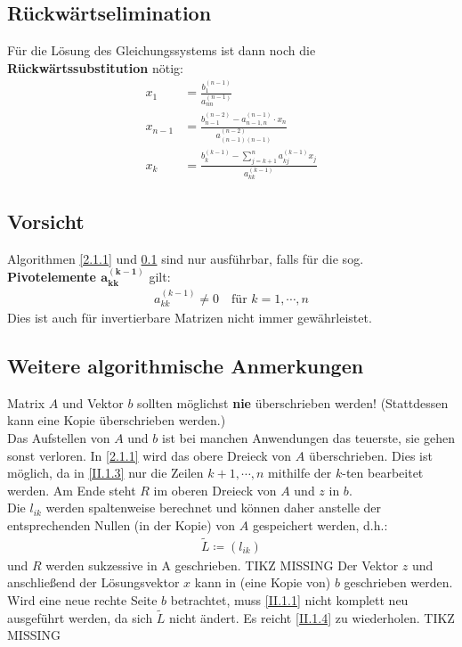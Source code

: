 \documentclass[ngerman,fontsize=11pt, paper=a4, parskip=false, titlepage=false, toc=bib]{scrbook}
\begin{document}
\subsection{Rückwärtselimination}\label{2.1.2}
Für die Lösung des Gleichungssystems ist dann noch die \textbf{Rückwärtssubstitution}  nötig:
\begin{align}
	x_1 &= \frac{b_1^{(n-1)}}{a_{nn}^{(n-1)}} \label{II.1.5} \\
	x_{n-1} &=  \frac{b_{n-1}^{(n-2)}-a_{n-1,n}^{(n-1)}\cdot x_n}{a_{(n-1)(n-1)}^{(n-2)}} \label{II.1.6} \\
	x_k &= \frac{b_k^{(k-1)}-\sum_{j=k+1}^{n}a_{kj}^{(k-1)}x_j}{a_{kk}^{(k-1)}} \label{II.1.7}
\end{align}

\subsection{Vorsicht}
	Algorithmen \ref{2.1.1} und \ref{2.1.2} sind nur ausführbar, falls für die sog. \textbf{Pivotelemente $\mathbf{a_{kk}^{(k-1)}}$ }  gilt:
	\begin{gather*}
			a_{kk}^{(k-1)} \neq 0 \quad   \text{für } k=1, \cdots , n
	\end{gather*}
	Dies ist auch für invertierbare Matrizen nicht immer gewährleistet.
	
\subsection{Weitere algorithmische Anmerkungen}	\label{2.1.4}
Matrix $A$ und Vektor $b$ sollten möglichst \textbf{nie} überschrieben werden! (Stattdessen kann eine Kopie überschrieben werden.) \\
Das Aufstellen von $A$ und $b$ ist bei manchen Anwendungen das teuerste, sie gehen sonst verloren. In \ref{2.1.1} wird das obere Dreieck von $A$ überschrieben. Dies ist möglich, da in \eqref{II.1.3} nur die Zeilen $k+1, \cdots, n$ mithilfe der $k$-ten bearbeitet werden. Am Ende steht $R$ im oberen Dreieck von $A$ und $z$ in $b$. \\
Die $l_{ik}$ werden spaltenweise berechnet und können daher anstelle der entsprechenden Nullen (in der Kopie) von $A$ gespeichert werden, d.h.:
\begin{gather}
	\widetilde{L} \coloneqq (l_{ik})  \label{II.1.8}
\end{gather}
und $R$ werden sukzessive in A geschrieben.
TIKZ MISSING
Der Vektor $z$ und anschließend der Lösungsvektor $x$ kann in (eine Kopie von) $b$ geschrieben werden.
Wird eine neue rechte Seite $b$ betrachtet, muss \ref{II.1.1} nicht komplett neu ausgeführt werden, da sich $\widetilde{L}$ nicht ändert. Es reicht \ref{II.1.4} zu wiederholen.
TIKZ MISSING
\end{document}
